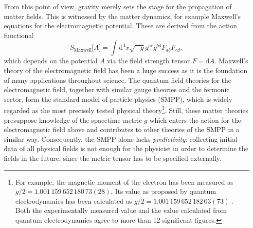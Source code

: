 From this point of view, gravity merely sets the stage for the propagation of matter fields. This is witnessed by the matter dynamics, for example Maxwell's equations for the electromagnetic potential. These are derived from the action functional
\begin{equation*}
  S_\text{Maxwell}\lbrack A\rbrack = \int\mathrm d^4x \sqrt{-g} g^{ac} g^{bd} F_{ab} F_{cd},
\end{equation*}
which depends on the potential $A$ via the field strength tensor $F = \mathrm dA$. Maxwell's theory of the electromagnetic field has been a huge success as it is the foundation of many applications throughout science. The quantum field theories for the electromagnetic field, together with similar gauge theories and the fermonic sector, form the standard model of particle physics (SMPP), which is widely regarded as the most precisely tested physical theory\footnote{For example, the magnetic moment of the electron has been measured as $g/2 = 1.001\,159\,652\,180\,73(28)$. \cite{Hanneke_2011} Its value as proposed by quantum electrodynamics has been calculated as $g/2 = 1.001\,159\,652\,182\,03(73)$ \cite{Aoyama_2017}. Both the experimentally measured value and the value calculated from quantum electrodynamics agree to more than 12 significant figures.}. Still, these matter theories presuppose knowledge of the spacetime metric $g$ which enters the action for the electromagnetic field above and contributes to other theories of the SMPP in a similar way. Consequently, the SMPP alone lacks \emph{predictivity}: collecting initial data of all physical fields is not enough for the physicist in order to determine the fields in the future, since the metric tensor has to be specified externally. 

